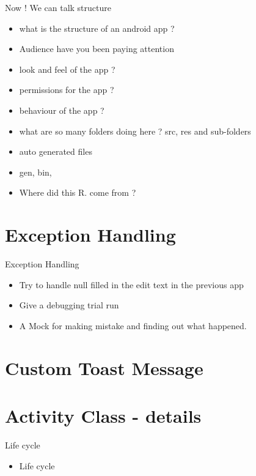 \documentclass[11pt]{beamer}
\begin{document}
\begin{frame}[containsverbatim]{Now ! We can talk structure }
	\begin{flushleft}
	\begin{itemize}
		\item what is the structure of an android app ?
		\item Audience have you been paying attention
		\item look and feel of the app ?
		\item permissions for the app ?
		\item behaviour of the app ?
		\item what are so many folders doing here ? 
	          src, res and sub-folders
		\item auto generated files
		\item gen, bin, 
		\item Where did this R. come from ?
	\end{itemize}
	\end{flushleft}
\end{frame}

\section{Exception Handling}
\begin{frame}[containsverbatim]{Exception Handling}
	\begin{flushleft}
	\begin{itemize}
		\item Try to handle null filled in the edit text in the previous app 
		\item Give a debugging trial run
		\item A Mock for making mistake and finding out what happened.
	\end{itemize}
	\end{flushleft}
\end{frame}


\section{Custom Toast Message}

\section{Activity Class - details}
\begin{frame}[containsverbatim]{Life cycle}
	\begin{flushleft}
	\begin{itemize}
		\item Life cycle
	\end{itemize}
	\end{flushleft}
\end{frame}
\end{document}

